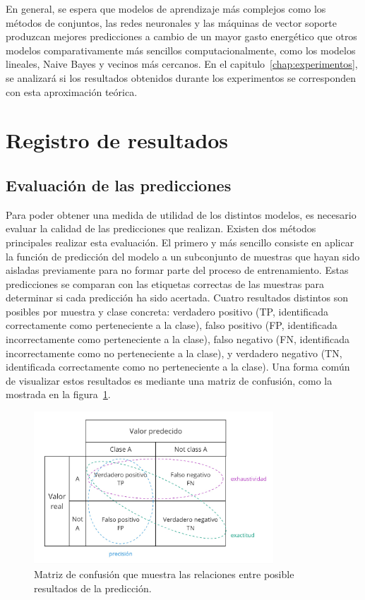 En general, se espera que modelos de aprendizaje más complejos como los métodos de conjuntos, las redes neuronales y las máquinas de vector soporte produzcan mejores predicciones a cambio de un mayor gasto energético que otros modelos comparativamente más sencillos computacionalmente, como los modelos lineales, Naive Bayes y vecinos más cercanos. En el capitulo~\ref{chap:experimentos}, se analizará si los resultados obtenidos durante los experimentos se corresponden con esta aproximación teórica.


\section{Registro de resultados}

\subsection{Evaluación de las predicciones}
\label{sec:scoring}

Para poder obtener una medida de utilidad de los distintos modelos, es necesario evaluar la calidad de las predicciones que realizan. Existen dos métodos principales realizar esta evaluación. El primero y más sencillo consiste en aplicar la función de predicción del modelo a un subconjunto de muestras que hayan sido aisladas previamente para no formar parte del proceso de entrenamiento. Estas predicciones se comparan con las etiquetas correctas de las muestras para determinar si cada predicción ha sido acertada.
Cuatro resultados distintos son posibles por muestra y clase concreta: verdadero positivo (TP, identificada correctamente como perteneciente a la clase), falso positivo (FP, identificada incorrectamente como perteneciente a la clase), falso negativo (FN, identificada incorrectamente como no perteneciente a la clase), y verdadero negativo (TN, identificada correctamente como no perteneciente a la clase). Una forma común de visualizar estos resultados es mediante una matriz de confusión, como la mostrada en la figura~\ref{fig:confusion-matrix}.

\begin{figure}[H]
  \centerline{
     \includegraphics[width=0.8\textwidth, keepaspectratio]{img/confusion-matrix.jpg}
  }
  \caption{Matriz de confusión que muestra las relaciones entre posible resultados de la predicción.}
  \label{fig:confusion-matrix}
\end{figure}

